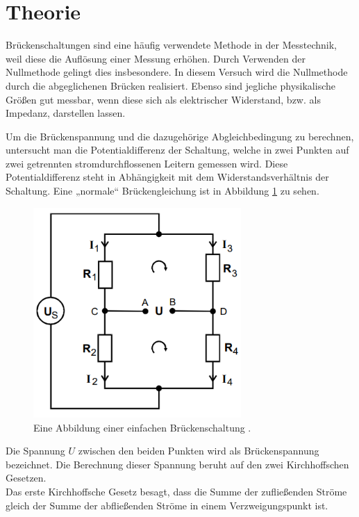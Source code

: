 \section{Theorie}

\begin{flushleft}
    Brückenschaltungen sind eine häufig verwendete Methode in der Messtechnik, weil diese die Auflösung einer Messung erhöhen.
    Durch Verwenden der Nullmethode gelingt dies insbesondere.
    In diesem Versuch wird die Nullmethode durch die abgeglichenen Brücken realisiert.
    Ebenso sind jegliche physikalische Größen gut messbar, wenn diese sich als elektrischer Widerstand, bzw. als Impedanz, darstellen lassen.  
\end{flushleft}

\begin{flushleft}
    Um die Brückenspannung und die dazugehörige Abgleichbedingung zu berechnen, untersucht man die Potentialdifferenz der Schaltung, welche in zwei Punkten auf zwei getrennten stromdurchflossenen Leitern gemessen wird. 
    Diese Potentialdifferenz steht in Abhängigkeit mit dem Widerstandsverhältnis der Schaltung. 
    Eine „normale“ Brückengleichung ist in Abbildung \ref{Abbildung1} zu sehen.
\end{flushleft}

\begin{figure}[H]
    \centering
    \includegraphics[height=80mm]{bilder/Abbildung1.png}
    \caption{Eine Abbildung einer einfachen Brückenschaltung \cite{a1}. \label{Abbildung1} }
\end{figure}

\begin{flushleft}
    Die Spannung $U$ zwischen den beiden Punkten wird als Brückenspannung bezeichnet. 
    Die Berechnung dieser Spannung beruht auf den zwei Kirchhoffschen Gesetzen. \\
    Das erste Kirchhoffsche Gesetz besagt, dass die Summe der zufließenden Ströme gleich der Summe der abfließenden Ströme in einem Verzweigungspunkt ist.
\end{flushleft}

